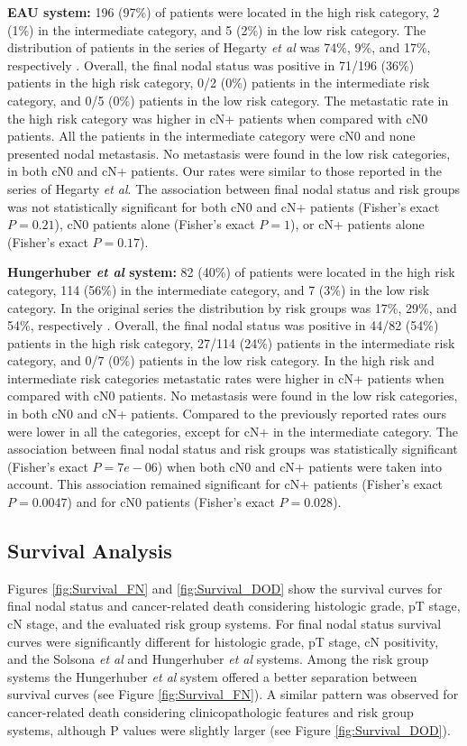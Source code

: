 \documentclass[11pt,letterpaper]{article}\usepackage[]{graphicx}\usepackage[]{color}
\begin{document}
\begin{multicols}{2}
\textbf{EAU system:} 196 (97\%) of patients were located in the high risk category, 2 (1\%) in the intermediate category, and 5 (2\%) in the low risk category. The distribution of patients in the series of Hegarty \emph{et al} was 74\%, 9\%, and 17\%, respectively \cite{Hegarty2006}. Overall, the final nodal status was positive in 71/196 (36\%) patients in the high risk category, 0/2 (0\%) patients in the intermediate risk category, and 0/5 (0\%) patients in the low risk category. The metastatic rate in the high risk category was higher in cN+ patients when compared with cN0 patients. All the patients in the intermediate category were cN0 and none presented nodal metastasis. No metastasis were found in the low risk categories, in both cN0 and cN+ patients. Our rates were similar to those reported in the series of Hegarty \emph{et al}. The association between final nodal status and risk groups was not statistically significant for both cN0 and cN+ patients (Fisher's exact $P=0.21$), cN0 patients alone (Fisher's exact $P=1$), or cN+ patients alone (Fisher's exact $P=0.17$).

\textbf{Hungerhuber \emph{et al} system:} 82 (40\%) of patients were located in the high risk category, 114 (56\%) in the intermediate category, and 7 (3\%) in the low risk category. In the original series the distribution by risk groups was 17\%, 29\%, and 54\%, respectively \cite{Hungerhuber2006}. Overall, the final nodal status was positive in 44/82 (54\%) patients in the high risk category, 27/114 (24\%) patients in the intermediate risk category, and 0/7 (0\%) patients in the low risk category. In the high risk and intermediate risk categories metastatic rates were higher in cN+ patients when compared with cN0 patients. No metastasis were found in the low risk categories, in both cN0 and cN+ patients. Compared to the previously reported rates ours were lower in all the categories, except for cN+ in the intermediate category. The association between final nodal status and risk groups was statistically significant (Fisher's exact $P=7e-06$) when both cN0 and cN+ patients were taken into account. This association remained significant for cN+ patients (Fisher's exact $P=0.0047$) and for cN0 patients (Fisher's exact $P=0.028$).

\subsection*{Survival Analysis}
Figures \ref{fig:Survival_FN} and \ref{fig:Survival_DOD} show the survival curves for final nodal status and cancer-related death considering histologic grade, pT stage, cN stage, and the evaluated risk group systems. For final nodal status survival curves were significantly different for histologic grade, pT stage, cN positivity, and the Solsona \emph{et al} and Hungerhuber \emph{et al} systems. Among the risk group systems the Hungerhuber \emph{et al} system offered a better separation between survival curves (see Figure \ref{fig:Survival_FN}). A similar pattern was observed for cancer-related death considering clinicopathologic features and risk group systems, although P values were slightly larger (see Figure \ref{fig:Survival_DOD}).


\end{multicols}
\end{document}
